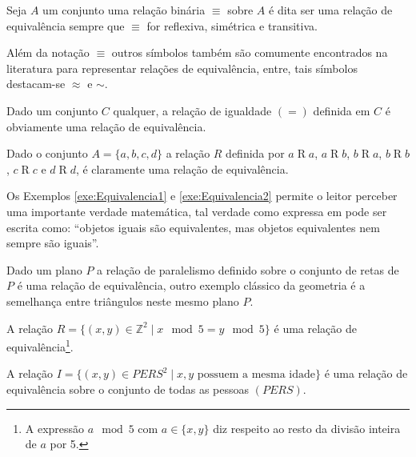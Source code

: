 \begin{definicao}\label{def:RelacaoEquivalencia}
	Seja $A$ um conjunto uma relação binária $\equiv$ sobre $A$ é dita ser uma relação de equivalência sempre que $\equiv$ for reflexiva, simétrica e transitiva.
\end{definicao}

Além da notação $\equiv$ outros símbolos também são comumente encontrados na literatura para representar relações de equivalência, entre, tais símbolos destacam-se $\approx$ e $\sim$.

\begin{exemplo}\label{exe:Equivalencia1}
	Dado um conjunto $C$ qualquer, a relação de igualdade $(=)$ definida em $C$ é obviamente uma relação de equivalência.
\end{exemplo}

\begin{exemplo}\label{exe:Equivalencia2}
	Dado o conjunto $A =\{a, b, c, d\}$ a relação $R$ definida por $a \mathrel{R} a$, $a \mathrel{R} b$, $b \mathrel{R} a$, $b \mathrel{R} b$, $c \mathrel{R} c$ e $d \mathrel{R} d$, é claramente uma relação de equivalência.
\end{exemplo}

Os Exemplos \ref{exe:Equivalencia1} e \ref{exe:Equivalencia2} permite o leitor perceber uma importante verdade matemática, tal verdade como expressa em \cite{carmo2013} pode ser escrita como: ``objetos iguais são equivalentes, mas objetos equivalentes nem sempre são iguais''.

\begin{exemplo}
	Dado um plano $P$ a relação de paralelismo definido sobre o conjunto de retas de $P$ é uma relação de equivalência, outro exemplo clássico da geometria é a semelhança entre triângulos neste mesmo plano $P$.
\end{exemplo}

\begin{exemplo}
	A relação $R = \{(x, y) \in \mathbb{Z}^2 \mid x \mod 5 = y \mod 5\}$ é uma relação de equivalência\footnote{A expressão $a\mod 5$ com $a \in \{x, y\}$ diz respeito ao resto da divisão inteira de $a$ por 5.}.
\end{exemplo}

\begin{exemplo}
	A relação $I =  \{(x, y) \in PERS^2 \mid x, y \text{ possuem a mesma idade}\}$ é uma relação de equivalência sobre o conjunto de todas as pessoas $(PERS)$.
\end{exemplo}

